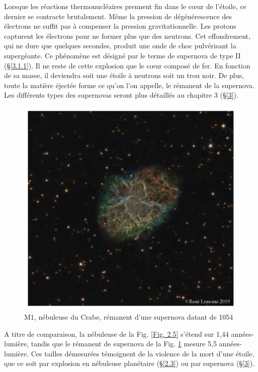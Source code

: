 Lorsque les réactions thermonucléaires prennent fin dans le cœur de l’étoile, ce dernier se contracte brutalement. Même la pression de dégénérescence des électrons ne suffit pas à compenser la pression gravitationnelle. Les protons capturent les électrons pour ne former plus que des neutrons. Cet effondrement, qui ne dure que quelques secondes, produit une onde de choc pulvérisant la supergéante. Ce phénomène est désigné par le terme de supernova de type II (§\ref{3.1.1}). Il ne reste de cette explosion que le cœur composé de fer. En fonction de sa masse, il deviendra soit une étoile à neutrons soit un trou noir. De plus, toute la matière éjectée forme ce qu’on l’on appelle, le rémanent de la supernova. Les différents types des supernovas seront plus détaillés au chapitre 3 (§\ref{3}).

\begin{figure}[H]
	\centering
	\includegraphics[scale=0.3]{images/m1}
	\caption[M1, nébuleuse du Crabe - astrophoto prise par René Lemoine le 29 janvier 2019 avec un Celestron 8 (6h de pose)]{M1, nébuleuse du Crabe, rémanent d'une supernova datant de 1054}
	\label{Fig. 2.7}
\end{figure}

A titre de comparaison, la nébuleuse de la Fig. \ref{Fig. 2.5} s'étend sur 1,44 années-lumière, tandis que le rémanent de supernova de la Fig. \ref{Fig. 2.7} mesure 5,5 années-lumière. Ces tailles démesurées témoignent de la violence de la mort d'une étoile, que ce soit par explosion en nébuleuse planétaire (§\ref{2.3}) ou par supernova (§\ref{3}). 

